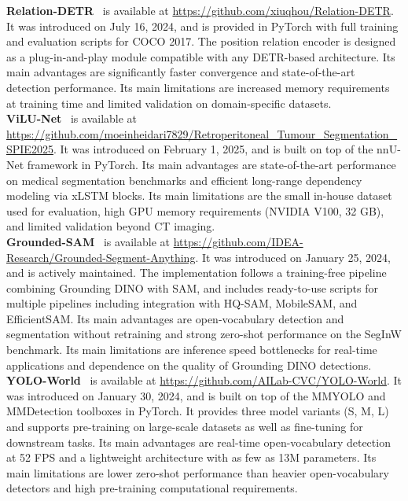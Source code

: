 \documentclass[11pt]{article}
\begin{document}
\textbf{Relation-DETR}~\cite{HouRelationDETR2024} is available at 
\url{https://github.com/xiuqhou/Relation-DETR}. It was introduced on July 16, 2024, 
and is provided in PyTorch with full training and evaluation scripts for COCO 2017. 
The position relation encoder is designed as a plug-in-and-play module compatible 
with any DETR-based architecture. Its main advantages are significantly faster 
convergence and state-of-the-art detection performance. Its main limitations are 
increased memory requirements at training time and limited validation on 
domain-specific datasets.\\

\textbf{ViLU-Net}~\cite{HeidariViLUNet2025} is available at 
\url{https://github.com/moeinheidari7829/Retroperitoneal_Tumour_Segmentation_SPIE2025}. 
It was introduced on February 1, 2025, and is built on top of the nnU-Net framework 
in PyTorch. Its main advantages are state-of-the-art performance on medical 
segmentation benchmarks and efficient long-range dependency modeling via xLSTM 
blocks. Its main limitations are the small in-house dataset used for evaluation, 
high GPU memory requirements (NVIDIA V100, 32 GB), and limited validation beyond 
CT imaging.\\

\textbf{Grounded-SAM}~\cite{RenGroundedSAM2024} is available at 
\url{https://github.com/IDEA-Research/Grounded-Segment-Anything}. It was introduced 
on January 25, 2024, and is actively maintained. The implementation follows a 
training-free pipeline combining Grounding DINO with SAM, and includes ready-to-use 
scripts for multiple pipelines including integration with HQ-SAM, MobileSAM, and 
EfficientSAM. Its main advantages are open-vocabulary detection and segmentation 
without retraining and strong zero-shot performance on the SegInW benchmark. Its 
main limitations are inference speed bottlenecks for real-time applications and 
dependence on the quality of Grounding DINO detections.\\

\textbf{YOLO-World}~\cite{ChengYOLOWorld2024} is available at 
\url{https://github.com/AILab-CVC/YOLO-World}. It was introduced on January 30, 
2024, and is built on top of the MMYOLO and MMDetection toolboxes in PyTorch. It 
provides three model variants (S, M, L) and supports pre-training on large-scale 
datasets as well as fine-tuning for downstream tasks. Its main advantages are 
real-time open-vocabulary detection at 52 FPS and a lightweight architecture with 
as few as 13M parameters. Its main limitations are lower zero-shot performance than 
heavier open-vocabulary detectors and high pre-training computational requirements.\\
\end{document}
